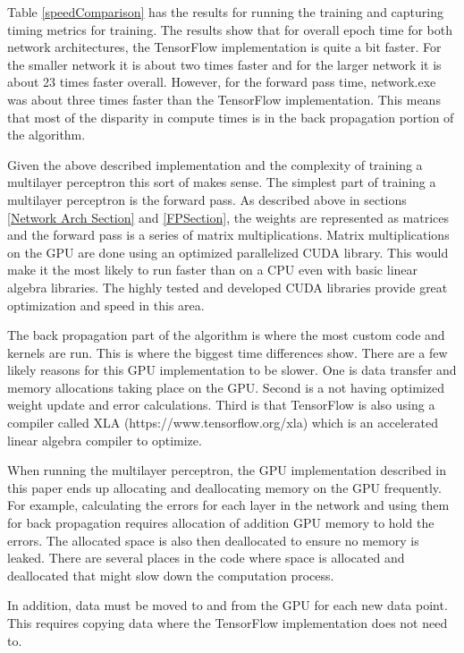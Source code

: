 \documentclass[jair, twoside,11pt,theapa]{article}
\begin{document}
Table \ref{speedComparison} has the results for running the training and capturing timing metrics for training. 
The results show that for overall epoch time for both network architectures, the TensorFlow implementation is quite a bit faster. 
For the smaller network it is about two times faster and for the larger network it is about 23 times faster overall. 
However, for the forward pass time, network.exe was about three times faster than the TensorFlow implementation. 
This means that most of the disparity in compute times is in the back propagation portion of the algorithm. 

Given the above described implementation and the complexity of training a multilayer perceptron this sort of makes sense. 
The simplest part of training a multilayer perceptron is the forward pass. 
As described above in sections \ref{Network Arch Section} and \ref{FPSection}, the weights are represented as matrices and the forward pass is a series of matrix multiplications. 
Matrix multiplications on the GPU are done using an optimized parallelized CUDA library.
This would make it the most likely to run faster than on a CPU even with basic linear algebra libraries. 
The highly tested and developed CUDA libraries provide great optimization and speed in this area. 

The back propagation part of the algorithm is where the most custom code and kernels are run. 
This is where the biggest time differences show. 
There are a few likely reasons for this GPU implementation to be slower. 
One is data transfer and memory allocations taking place on the GPU. 
Second is a not having optimized weight update and error calculations. 
Third is that TensorFlow is also using a compiler called XLA (https://www.tensorflow.org/xla) which is an accelerated linear algebra compiler to optimize. 

When running the multilayer perceptron, the GPU implementation described in this paper ends up allocating and deallocating memory on the GPU frequently. 
For example, calculating the errors for each layer in the network and using them for back propagation requires allocation of addition GPU memory to hold the errors. 
The allocated space is also then deallocated to ensure no memory is leaked. 
There are several places in the code where space is allocated and deallocated that might slow down the computation process. 

In addition, data must be moved to and from the GPU for each new data point. 
This requires copying data where the TensorFlow implementation does not need to. 
\end{document}

